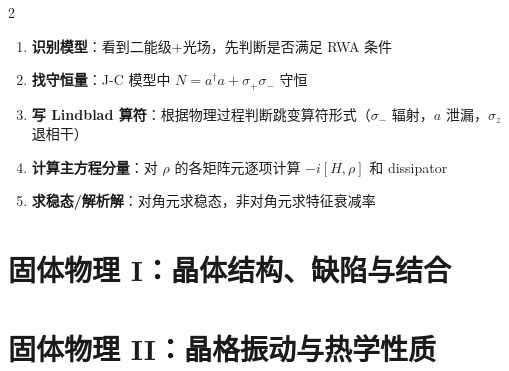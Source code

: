 \begin{multicols}{2}
\begin{thinkbox}
\begin{enumerate}
    \item \textbf{识别模型}：看到二能级+光场，先判断是否满足 RWA 条件
    \item \textbf{找守恒量}：J-C 模型中 $N=a^\dagger a + \sigma_+\sigma_-$ 守恒
    \item \textbf{写 Lindblad 算符}：根据物理过程判断跳变算符形式（$\sigma_-$ 辐射，$a$ 泄漏，$\sigma_z$ 退相干）
    \item \textbf{计算主方程分量}：对 $\rho$ 的各矩阵元逐项计算 $-i[H,\rho]$ 和 dissipator
    \item \textbf{求稳态/解析解}：对角元求稳态，非对角元求特征衰减率
\end{enumerate}
\end{thinkbox}
\end{multicols}

\newpage

\newpage

\newpage

\newpage

\newpage

\newpage

\newpage

\newpage

\newpage

\newpage
\part{固体物理 I：晶体结构、缺陷与结合}\label{part:solid1}\setpartcolor{\value{part}}

\newpage


\newpage

\newpage

\newpage

\newpage

\newpage

\newpage

\newpage

\newpage

\newpage

\newpage

\newpage

\newpage

\newpage

\newpage

\newpage

\newpage
\part{固体物理 II：晶格振动与热学性质}\label{part:solid2}\setpartcolor{\value{part}}
\newpage

\newpage

\newpage

\newpage

\newpage

\newpage

\newpage

\newpage

\newpage

\newpage

\newpage

\newpage

\newpage

\newpage

\newpage

\newpage

\newpage

\newpage

\newpage

\newpage

